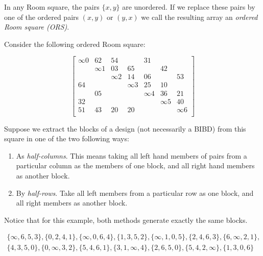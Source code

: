 \documentclass[
  11pt,
  a4paper]{book}
\begin{document}
In any Room square, the pairs \(\{x, y\}\) are unordered. If we
replace these pairs by one of the ordered pairs \((x, y)\) or
\((y, x)\) we call the resulting array an
\emph{ordered Room square (ORS)}.

Consider the following ordered Room square:

\begin{equation}
  \begin{bmatrix}
    \infty 0 &    62    &    54    &            &    31    &            &          \\
             & \infty 1 &    03    &     65     &          &     42     &          \\
             &          & \infty 2 &     14     &    06    &            &    53    \\
      64     &          &          &  \infty 3  &    25    &     10     &          \\
             &    05    &          &            & \infty 4 &     36     &    21    \\
      32     &          &          &            &          &  \infty 5  &    40    \\
      51     &    43    &    20    &     20     &          &            & \infty 6 \\
  \end{bmatrix}
\end{equation}

Suppose we extract the blocks of a design (not necessarily a
BIBD) from this square in one of the two following ways:

\begin{enumerate}
\def\labelenumi{\arabic{enumi}.}
\item
  As \emph{half-columns}. This means taking all left hand
  members of pairs from a particular column as the members
  of one block, and all right hand members as another
  block.
\item
  By \emph{half-rows}. Take all left members from a particular
  row as one block, and all right members as another
  block.
\end{enumerate}

Notice that for this example, both methods generate exactly
the same blocks.

\begin{equation}
\begin{split}
\{\infty,6,5,3\},\{0,2,4,1\},\{\infty,0,6,4\},\{1,3,5,2\},\{\infty,1,0,5\},\{2,4,6,3\},\{6, \infty,2,1\}, \\
\{4,3,5,0\},\{0,\infty,3,2\},\{5,4,6,1\},\{3,1,\infty,4\},\{2,6,5,0\},\{5,4,2,\infty\},\{1, 3,0,6\}
\end{split}
\end{equation}
\end{document}
